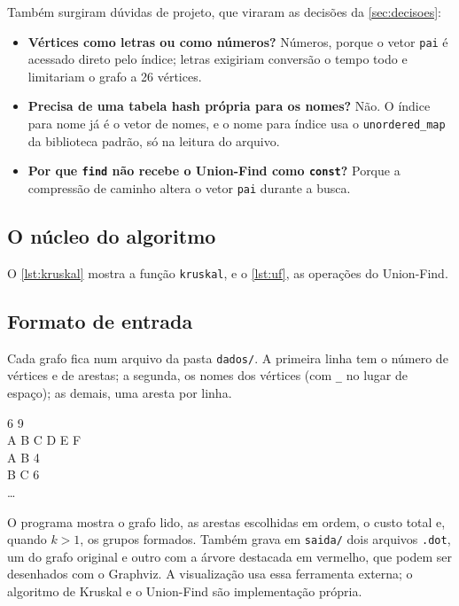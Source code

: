 \documentclass[a4paper]{article}
\begin{document}
Também surgiram dúvidas de projeto, que viraram as decisões da \cref{sec:decisoes}:
\begin{itemize}
    \item \textbf{Vértices como letras ou como números?} Números, porque o vetor
    \texttt{pai} é acessado direto pelo índice; letras exigiriam conversão o tempo
    todo e limitariam o grafo a 26 vértices.
    \item \textbf{Precisa de uma tabela hash própria para os nomes?} Não. O índice
    para nome já é o vetor de nomes, e o nome para índice usa o
    \texttt{unordered\_map} da biblioteca padrão, só na leitura do arquivo.
    \item \textbf{Por que \texttt{find} não recebe o Union-Find como
    \texttt{const}?} Porque a compressão de caminho altera o vetor \texttt{pai}
    durante a busca.
\end{itemize}

\subsection{O núcleo do algoritmo}

O \cref{lst:kruskal} mostra a função \texttt{kruskal}, e o \cref{lst:uf}, as
operações do Union-Find.



\subsection{Formato de entrada}

Cada grafo fica num arquivo da pasta \texttt{dados/}. A primeira linha tem o
número de vértices e de arestas; a segunda, os nomes dos vértices (com
\texttt{\_} no lugar de espaço); as demais, uma aresta por linha.

\begin{entrada}
6 9\\
A B C D E F\\
A B 4\\
B C 6\\
\ldots
\end{entrada}

O programa mostra o grafo lido, as arestas escolhidas em ordem, o custo total e,
quando $k > 1$, os grupos formados. Também grava em \texttt{saida/} dois arquivos
\texttt{.dot}, um do grafo original e outro com a árvore destacada em vermelho,
que podem ser desenhados com o Graphviz. A visualização usa essa ferramenta
externa; o algoritmo de Kruskal e o Union-Find são implementação própria.
\end{document}
